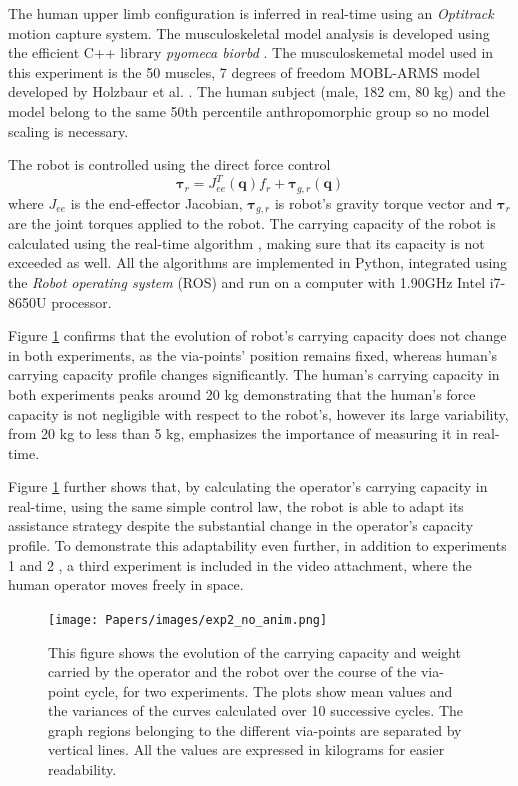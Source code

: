 The human upper limb configuration is inferred in real-time using an \textit{Optitrack} motion capture system. The musculoskeletal model analysis is developed using the efficient C++ library \textit{pyomeca biorbd} \cite{Michaud2021}. The musculoskemetal model used in this experiment is the 50 muscles, 7 degrees of freedom MOBL-ARMS model \cite{saul2015benchmarking}  {developed by Holzbaur et al. \cite{holzbaur2005model}. The human subject (male, 182 cm, 80 kg) and the model belong to the same 50th percentile anthropomorphic group \cite{gordon1989anthropometric} so no model scaling \cite{correa20112782} is necessary.}

The robot is controlled using the direct force control
$$
\bm{\tau}_r = J_{ee}^T(\bm{q}) f_r + \bm{\tau}_{g,r}(\bm{q})
$$
where $J_{ee}$ is the end-effector Jacobian, $\bm{\tau}_{g,r}$ is robot's gravity torque vector and $\bm{\tau}_r$ are the joint torques applied to the robot. 
{The carrying capacity of the robot is calculated using the real-time algorithm} \cite{skuric:hal-02993408}, making sure that its capacity is not exceeded as well. All the algorithms are implemented in Python, integrated using the \textit{Robot operating system} (ROS) and run on a computer with 1.90GHz Intel i7-8650U processor. 

Figure \ref{fig:experiment_results} confirms that the evolution of robot's carrying capacity does not change in both experiments, as the via-points' position remains fixed, {whereas human's carrying capacity profile changes significantly}. The human's carrying capacity in both experiments peaks around 20 kg demonstrating that the human's force capacity is not negligible with respect to the robot's, however its large variability, from 20 kg to less than 5 kg, emphasizes the importance of measuring it in real-time.    

Figure \ref{fig:experiment_results} further shows that, by calculating the operator's carrying capacity in real-time, { using the same simple control law, the robot is able to adapt its assistance strategy despite the substantial change in the operator's capacity profile.}
To demonstrate this adaptability even further, in addition to  experiments 1 and 2 , a third experiment is included in the video attachment, where the human operator moves freely in space. 

\begin{figure}[!t]
    \centering
    \texttt{[image: Papers/images/exp2\_no\_anim.png]}
    \caption{This figure shows the evolution of the carrying capacity and weight carried by the operator and the robot over the course of the via-point cycle, for two experiments. The plots show mean values and the variances of the curves calculated over 10 successive cycles. The graph regions belonging to the different via-points are separated by vertical lines.  All the values are expressed in kilograms for easier readability.}
    \label{fig:experiment_results}
\end{figure}


